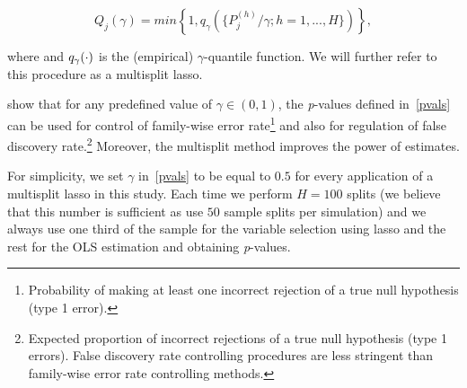 \documentclass[a4paper,12pt]{article}
\begin{document}
\begin{equation}\label{pvals}
Q_j(\gamma)=min \left \{1,q_{\gamma} (   \{ P^{(h)}_j/\gamma; h=1,...,H\}) \right \},
\end{equation}

 where and $q_{\gamma}(\tiny{\cdot})$ is the (empirical) $\gamma$-quantile function. We will further refer to this procedure as a multisplit lasso. 
 
\citet{pValsLasso} show that for any predefined value of $\gamma \in(0,1)$, the \textit{p}-values defined in~\eqref{pvals} can be used for control of family-wise error rate\footnote{Probability of making at least one incorrect rejection of a true null hypothesis (type 1 error).} and also for regulation of false discovery rate.\footnote{Expected proportion of incorrect rejections of a true null hypothesis (type 1 errors). False discovery rate controlling procedures are less stringent than family-wise error rate controlling methods.} Moreover, the multisplit method improves the power of estimates. 


For simplicity, we set $\gamma$ in~\eqref{pvals} to be equal to $0.5$ for every application of a multisplit lasso in this study. Each time we perform $H=100$ splits (we believe that this number is sufficient as \citet{pValsLasso} use $50$ sample splits per simulation) and we always use one third of the sample for the variable selection using lasso and the rest for the OLS estimation and obtaining \textit{p}-values.
\end{document}
